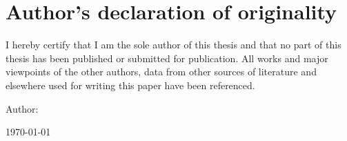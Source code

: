 \section*{\centering Author's declaration of originality}
I hereby certify that I am the sole author of this thesis and that no
part of this thesis has been published or submitted for publication.
All works and major viewpoints of the other authors, data from other
sources of literature and elsewhere used for writing this paper have
been referenced.


Author: \nameofauthor

\today
\pagebreak
